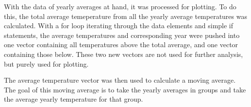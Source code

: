With the data of yearly averages at hand, it was processed for plotting. To do this, the total average temeperature from all the yearly average temperatures was calculated. With a for loop iterating through the data elements and simple if statements, the average temperatures and corresponding year were pushed into one vector containing all temperatures above the total average, and one vector containing those below. These two new vectors are not used for further analysis, but purely used for plotting.

The average temperature vector was then used to calculate a moving average. The goal of this moving average is to take the yearly averages in groups and take the average yearly temperature for that group. 



